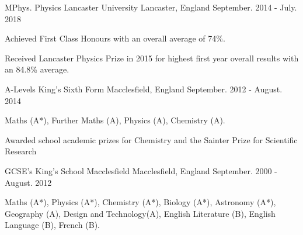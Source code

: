 

\begin{cventries}

  \cventry
    {MPhys. Physics} %
    {Lancaster University} %
    {Lancaster, England} %
    {September. 2014 - July. 2018} %
    {
      \begin{cvitems} %
        \item {Achieved First Class Honours with an overall average of 74\%.}
        \item {Received Lancaster Physics Prize in 2015 for highest first year overall results with an 84.8\% average.}
      \end{cvitems}
    }

  \cventry
    {A-Levels} %
    {King's Sixth Form} %
    {Macclesfield, England} %
    {September. 2012 - August. 2014} %
    {
      \begin{cvitems} %
        \item {Maths (A*), Further Maths (A), Physics (A), Chemistry (A).}
	\item{Awarded school academic prizes for Chemistry and the Sainter Prize for Scientific Research}
      \end{cvitems}
    }

  \cventry
    {GCSE's} %
    {King's School Macclesfield} %
    {Macclesfield, England} %
    {September. 2000 - August. 2012} %
    {
      \begin{cvitems} %
	\item{Maths (A*), Physics (A*), Chemistry (A*), Biology (A*), Astronomy (A*), Geography (A), Design and Technology(A), English Literature (B), English Language (B), French (B). }
      \end{cvitems}
    }
\end{cventries}

